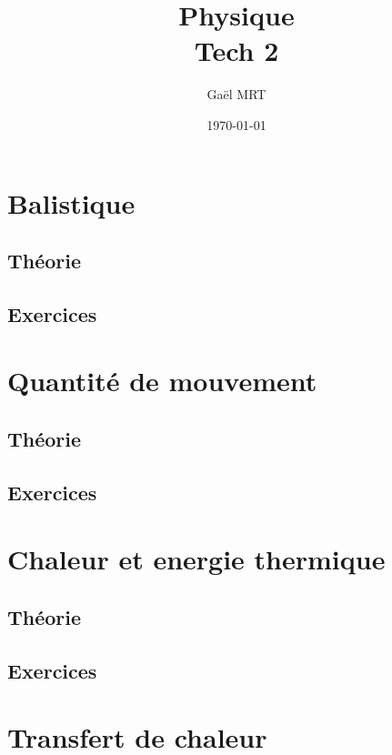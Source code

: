 \documentclass{report}
\title{Physique \\ Tech 2}
\author{Gaël MRT}
\date{\today}
\begin{document}
\maketitle

\tableofcontents
\thispagestyle{fancy}

\chapter{Balistique}
\thispagestyle{fancy}
\section{Théorie}

\section{Exercices}




\newpage
\chapter{Quantité de mouvement}
\thispagestyle{fancy}
\section{Théorie}



\section{Exercices}



\chapter{Chaleur et energie thermique}
\section{Théorie}



\section{Exercices}




\chapter{Transfert de chaleur}
\end{document}
